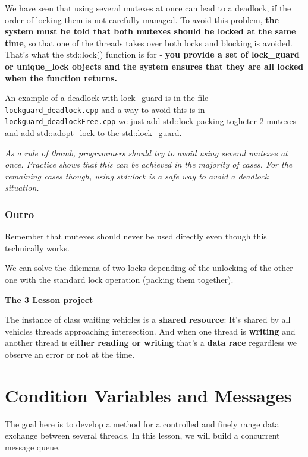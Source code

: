 \documentclass[11pt, a4paper]{article}
\begin{document}
We have seen that using several mutexes at once can lead to a deadlock, if the order of locking them is not carefully managed. To avoid this problem, \textbf{the system must be told that both mutexes should be locked at the same time}, so that one of the threads takes over both locks and blocking is avoided. That's what the std::lock() function is for - \textbf{you provide a set of lock\_guard or unique\_lock objects and the system ensures that they are all locked when the function returns.}  

An example of a deadlock with lock\_guard is in the file \texttt{lockguard\_deadlock.cpp}  and a way to avoid this is in \texttt{lockguard\_deadlockFree.cpp} we just add std::lock packing togheter 2 mutexes and add std::adopt\_lock to the std::lock\_guard.




\textit{As a rule of thumb, programmers should try to avoid using several mutexes at once. Practice shows that this can be achieved in the majority of cases. For the remaining cases though, using std::lock is a safe way to avoid a deadlock situation.}


\subsubsection{Outro}%
\label{ssub:outro}

Remember that mutexes should never be used directly even though this technically works. 

We can solve the dilemma of two locks depending of the unlocking of the other one with the standard lock operation (packing them together). 


\textbf{The 3 Lesson project}

The instance of class waiting vehicles is a \textbf{shared resource}: It's shared by all vehicles threads approaching intersection. And when one thread is \textbf{writing} and another thread is \textbf{either reading or writing} that's a \textbf{data race} regardless we observe an error or not at the time. 






\section{Condition Variables and Messages}%
\label{sec:condition_variables_and_messages}


The goal here is to develop a method for a controlled and finely range data exchange between several threads. In this lesson, we will build a concurrent message queue.
\end{document}
